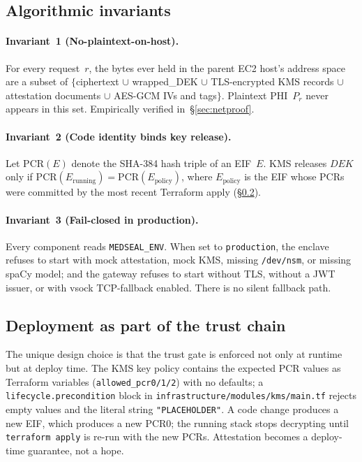 \documentclass[11pt]{article}
\begin{document}
\subsection{Algorithmic invariants}

\paragraph{Invariant~1 (No-plaintext-on-host).}
For every request~$r$, the bytes ever held in the parent EC2
host's address space are a subset of $\{$ciphertext $\cup$
wrapped\_DEK $\cup$ TLS-encrypted KMS records $\cup$ attestation
documents $\cup$ AES-GCM IVs and tags$\}$. Plaintext PHI~$P_r$
never appears in this set. Empirically verified
in~\S\ref{sec:netproof}.

\paragraph{Invariant~2 (Code identity binds key release).}
Let $\mathrm{PCR}(E)$ denote the SHA-384 hash triple of an
EIF~$E$. KMS releases $DEK$ only if
$\mathrm{PCR}(E_{\mathrm{running}}) = \mathrm{PCR}(E_{\mathrm{policy}})$,
where $E_{\mathrm{policy}}$ is the EIF whose PCRs were committed by
the most recent Terraform apply (\S\ref{sec:tfflow}).

\paragraph{Invariant~3 (Fail-closed in production).}
Every component reads \texttt{MEDSEAL\_ENV}. When set to
\texttt{production}, the enclave refuses to start with mock
attestation, mock KMS, missing \texttt{/dev/nsm}, or missing
spaCy model; and the gateway refuses to start without TLS, without
a JWT issuer, or with vsock TCP-fallback enabled. There is no
silent fallback path.

\subsection{Deployment as part of the trust chain}\label{sec:tfflow}

The unique design choice is that the trust gate is enforced not only
at runtime but at deploy time. The KMS key policy contains the
expected PCR values as Terraform variables
(\texttt{allowed\_pcr0/1/2}) with no defaults; a
\texttt{lifecycle.precondition} block in
\texttt{infrastructure/modules/kms/main.tf} rejects empty values
and the literal string \texttt{"PLACEHOLDER"}. A code change
produces a new EIF, which produces a new PCR0; the running stack
stops decrypting until \texttt{terraform apply} is re-run with the
new PCRs. Attestation becomes a deploy-time guarantee, not a hope.
\end{document}
